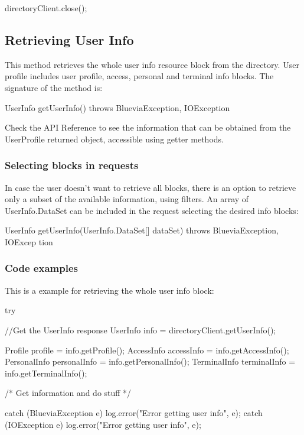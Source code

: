 \begin{DoxyCode}
directoryClient.close();
\end{DoxyCode}
\hypertarget{blv_directory_guide_retrieving_user_info_sec}{}\subsection{Retrieving User Info}\label{blv_directory_guide_retrieving_user_info_sec}
This method retrieves the whole user info resource block from the directory. User profile includes user profile, access, personal and terminal info blocks. The signature of the method is:


\begin{DoxyCode}
UserInfo getUserInfo() throws BlueviaException, IOException
\end{DoxyCode}


Check the API Reference to see the information that can be obtained from the UserProfile returned object, accessible using getter methods.\hypertarget{blv_directory_guide_retrieving_user_info_using_filters_sec}{}\subsubsection{Selecting blocks in requests}\label{blv_directory_guide_retrieving_user_info_using_filters_sec}
In case the user doesn't want to retrieve all blocks, there is an option to retrieve only a subset of the available information, using filters. An array of UserInfo.DataSet can be included in the request selecting the desired info blocks:


\begin{DoxyCode}
UserInfo getUserInfo(UserInfo.DataSet[] dataSet) throws BlueviaException, IOExcep
      tion
\end{DoxyCode}
\hypertarget{blv_directory_guide_user_info_code_example_sec}{}\subsubsection{Code examples}\label{blv_directory_guide_user_info_code_example_sec}
This is a example for retrieving the whole user info block:


\begin{DoxyCode}
try {
        //Get the UserInfo response
        UserInfo info = directoryClient.getUserInfo();

        Profile profile = info.getProfile();
        AccessInfo accessInfo = info.getAccessInfo();
        PersonalInfo personalInfo = info.getPersonalInfo();
        TerminalInfo terminalInfo = info.getTerminalInfo();     
        
        /* Get information and do stuff */
          
} catch (BlueviaException e) {
        log.error("Error getting user info", e);
} catch (IOException e) {
        log.error("Error getting user info", e);
}
\end{DoxyCode}


